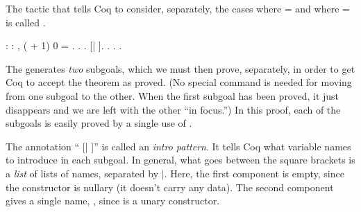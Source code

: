 \documentclass[12pt]{report}
\begin{document}
    The tactic that tells Coq to consider, separately, the cases where
     =  and where  =   is called . \begin{coqdoccode}
\coqdocemptyline
\coqdocnoindent
{}  : \coqdockw{\ensuremath{\forall}}  : ,\coqdoceol
\coqdocindent{1.00em}
 ( + 1) 0 = .\coqdoceol
\coqdocnoindent
{}.\coqdoceol
\coqdocindent{1.00em}
 .    [| ].\coqdoceol
\coqdocindent{2.00em}
.\coqdoceol
\coqdocindent{2.00em}
. .\coqdoceol
\coqdocemptyline
\end{coqdoccode}
The  generates \textit{two} subgoals, which we must then
    prove, separately, in order to get Coq to accept the theorem as
    proved.  (No special command is needed for moving from one subgoal
    to the other.  When the first subgoal has been proved, it just
    disappears and we are left with the other ``in focus.'')  In this
    proof, each of the subgoals is easily proved by a single use of
    .


    The annotation `` [| ]'' is called an \textit{intro pattern}.  It
    tells Coq what variable names to introduce in each subgoal.  In
    general, what goes between the square brackets is a \textit{list} of
    lists of names, separated by \ensuremath{|}.  Here, the first component is
    empty, since the  constructor is nullary (it doesn't carry any
    data).  The second component gives a single name, , since 
    is a unary constructor.
\end{document}
